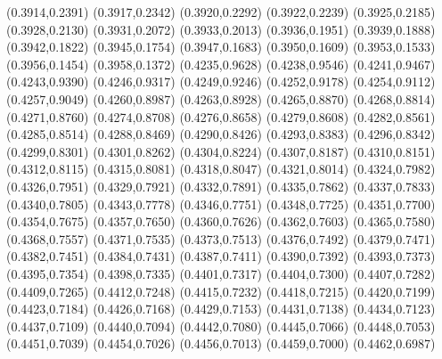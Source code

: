 \PST@Cross(0.3914,0.2391)
\PST@Cross(0.3917,0.2342)
\PST@Cross(0.3920,0.2292)
\PST@Cross(0.3922,0.2239)
\PST@Cross(0.3925,0.2185)
\PST@Cross(0.3928,0.2130)
\PST@Cross(0.3931,0.2072)
\PST@Cross(0.3933,0.2013)
\PST@Cross(0.3936,0.1951)
\PST@Cross(0.3939,0.1888)
\PST@Cross(0.3942,0.1822)
\PST@Cross(0.3945,0.1754)
\PST@Cross(0.3947,0.1683)
\PST@Cross(0.3950,0.1609)
\PST@Cross(0.3953,0.1533)
\PST@Cross(0.3956,0.1454)
\PST@Cross(0.3958,0.1372)
\PST@Cross(0.4235,0.9628)
\PST@Cross(0.4238,0.9546)
\PST@Cross(0.4241,0.9467)
\PST@Cross(0.4243,0.9390)
\PST@Cross(0.4246,0.9317)
\PST@Cross(0.4249,0.9246)
\PST@Cross(0.4252,0.9178)
\PST@Cross(0.4254,0.9112)
\PST@Cross(0.4257,0.9049)
\PST@Cross(0.4260,0.8987)
\PST@Cross(0.4263,0.8928)
\PST@Cross(0.4265,0.8870)
\PST@Cross(0.4268,0.8814)
\PST@Cross(0.4271,0.8760)
\PST@Cross(0.4274,0.8708)
\PST@Cross(0.4276,0.8658)
\PST@Cross(0.4279,0.8608)
\PST@Cross(0.4282,0.8561)
\PST@Cross(0.4285,0.8514)
\PST@Cross(0.4288,0.8469)
\PST@Cross(0.4290,0.8426)
\PST@Cross(0.4293,0.8383)
\PST@Cross(0.4296,0.8342)
\PST@Cross(0.4299,0.8301)
\PST@Cross(0.4301,0.8262)
\PST@Cross(0.4304,0.8224)
\PST@Cross(0.4307,0.8187)
\PST@Cross(0.4310,0.8151)
\PST@Cross(0.4312,0.8115)
\PST@Cross(0.4315,0.8081)
\PST@Cross(0.4318,0.8047)
\PST@Cross(0.4321,0.8014)
\PST@Cross(0.4324,0.7982)
\PST@Cross(0.4326,0.7951)
\PST@Cross(0.4329,0.7921)
\PST@Cross(0.4332,0.7891)
\PST@Cross(0.4335,0.7862)
\PST@Cross(0.4337,0.7833)
\PST@Cross(0.4340,0.7805)
\PST@Cross(0.4343,0.7778)
\PST@Cross(0.4346,0.7751)
\PST@Cross(0.4348,0.7725)
\PST@Cross(0.4351,0.7700)
\PST@Cross(0.4354,0.7675)
\PST@Cross(0.4357,0.7650)
\PST@Cross(0.4360,0.7626)
\PST@Cross(0.4362,0.7603)
\PST@Cross(0.4365,0.7580)
\PST@Cross(0.4368,0.7557)
\PST@Cross(0.4371,0.7535)
\PST@Cross(0.4373,0.7513)
\PST@Cross(0.4376,0.7492)
\PST@Cross(0.4379,0.7471)
\PST@Cross(0.4382,0.7451)
\PST@Cross(0.4384,0.7431)
\PST@Cross(0.4387,0.7411)
\PST@Cross(0.4390,0.7392)
\PST@Cross(0.4393,0.7373)
\PST@Cross(0.4395,0.7354)
\PST@Cross(0.4398,0.7335)
\PST@Cross(0.4401,0.7317)
\PST@Cross(0.4404,0.7300)
\PST@Cross(0.4407,0.7282)
\PST@Cross(0.4409,0.7265)
\PST@Cross(0.4412,0.7248)
\PST@Cross(0.4415,0.7232)
\PST@Cross(0.4418,0.7215)
\PST@Cross(0.4420,0.7199)
\PST@Cross(0.4423,0.7184)
\PST@Cross(0.4426,0.7168)
\PST@Cross(0.4429,0.7153)
\PST@Cross(0.4431,0.7138)
\PST@Cross(0.4434,0.7123)
\PST@Cross(0.4437,0.7109)
\PST@Cross(0.4440,0.7094)
\PST@Cross(0.4442,0.7080)
\PST@Cross(0.4445,0.7066)
\PST@Cross(0.4448,0.7053)
\PST@Cross(0.4451,0.7039)
\PST@Cross(0.4454,0.7026)
\PST@Cross(0.4456,0.7013)
\PST@Cross(0.4459,0.7000)
\PST@Cross(0.4462,0.6987)
